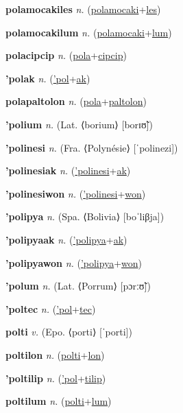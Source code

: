 \textbf{\hypertarget{polamocakiles}{polamocakiles}} \textit{n.} (\hyperlink{polamocaki}{polamocaki}+\allowbreak \hyperlink{les}{les})


\textbf{\hypertarget{polamocakilum}{polamocakilum}} \textit{n.} (\hyperlink{polamocaki}{polamocaki}+\allowbreak \hyperlink{lum}{lum})


\textbf{\hypertarget{polacipcip}{polacipcip}} \textit{n.} (\hyperlink{pola}{pola}+\allowbreak \hyperlink{cipcip}{cipcip})


\textbf{\hypertarget{'polak}{'polak}} \textit{n.} (\hyperlink{'pol}{'pol}+\allowbreak \hyperlink{ak}{ak})


\textbf{\hypertarget{polapaltolon}{polapaltolon}} \textit{n.} (\hyperlink{pola}{pola}+\allowbreak \hyperlink{paltolon}{paltolon})


\textbf{\hypertarget{'polium}{'polium}} \textit{n.} (Lat. ⟨borium⟩ [borɪʊ̃])


\textbf{\hypertarget{'polinesi}{'polinesi}} \textit{n.} (Fra. ⟨Polynésie⟩ [ˈpolinezi])


\textbf{\hypertarget{'polinesiak}{'polinesiak}} \textit{n.} (\hyperlink{'polinesi}{'polinesi}+\allowbreak \hyperlink{ak}{ak})


\textbf{\hypertarget{'polinesiwon}{'polinesiwon}} \textit{n.} (\hyperlink{'polinesi}{'polinesi}+\allowbreak \hyperlink{won}{won})


\textbf{\hypertarget{'polipya}{'polipya}} \textit{n.} (Spa. ⟨Bolivia⟩ [boˈliβja])


\textbf{\hypertarget{'polipyaak}{'polipyaak}} \textit{n.} (\hyperlink{'polipya}{'polipya}+\allowbreak \hyperlink{ak}{ak})


\textbf{\hypertarget{'polipyawon}{'polipyawon}} \textit{n.} (\hyperlink{'polipya}{'polipya}+\allowbreak \hyperlink{won}{won})


\textbf{\hypertarget{'polum}{'polum}} \textit{n.} (Lat. ⟨Porrum⟩ [pɔrːʊ̃])


\textbf{\hypertarget{'poltec}{'poltec}} \textit{n.} (\hyperlink{'pol}{'pol}+\allowbreak \hyperlink{tec}{tec})


\textbf{\hypertarget{polti}{polti}} \textit{v.} (Epo. ⟨porti⟩ [ˈporti])


\textbf{\hypertarget{poltilon}{poltilon}} \textit{n.} (\hyperlink{polti}{polti}+\allowbreak \hyperlink{lon}{lon})


\textbf{\hypertarget{'poltilip}{'poltilip}} \textit{n.} (\hyperlink{'pol}{'pol}+\allowbreak \hyperlink{tilip}{tilip})


\textbf{\hypertarget{poltilum}{poltilum}} \textit{n.} (\hyperlink{polti}{polti}+\allowbreak \hyperlink{lum}{lum})


